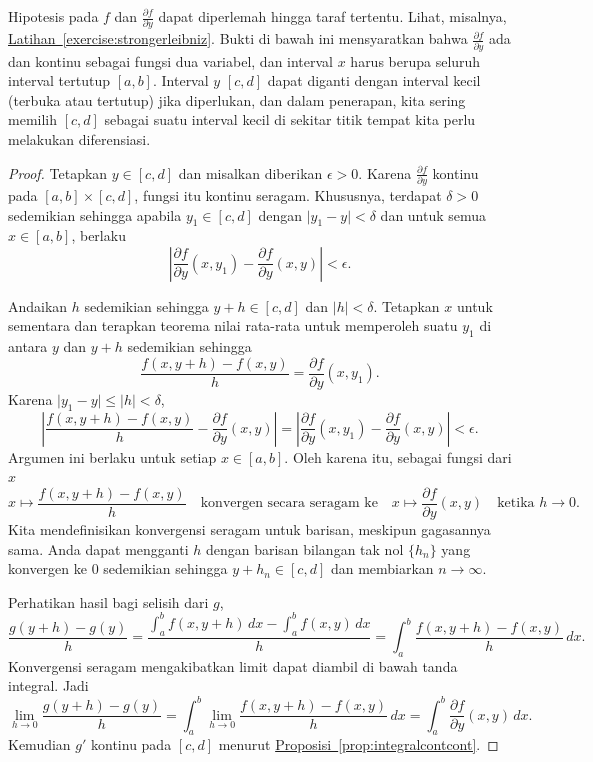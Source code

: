 \documentclass[12pt,openany]{book}
\newcommand{\sabs}[1]{\lvert {#1} \rvert}
\newcommand{\abs}[1]{\left\lvert {#1} \right\rvert}
\theoremstyle{plain}
\theoremstyle{remark}
\theoremstyle{definition}
\theoremstyle{exercise}
\theoremstyle{example}
\newcommand{\exerciseref}[1]{\hyperref[#1]{Latihan~\ref*{#1}}}
\newcommand{\propref}[1]{\hyperref[#1]{Proposisi~\ref*{#1}}}
\begin{document}
Hipotesis pada $f$ dan $\frac{\partial f}{\partial y}$ dapat
diperlemah hingga taraf tertentu. Lihat, misalnya, \exerciseref{exercise:strongerleibniz}.
Bukti di bawah ini mensyaratkan bahwa
$\frac{\partial f}{\partial y}$ ada dan kontinu
sebagai fungsi dua variabel, dan interval $x$ harus berupa seluruh
interval tertutup $[a,b]$.
Interval $y$
$[c,d]$ dapat diganti dengan interval kecil (terbuka atau tertutup) jika
diperlukan, dan dalam penerapan, kita sering memilih $[c,d]$ sebagai suatu
interval kecil di sekitar titik tempat kita perlu melakukan diferensiasi.

\begin{proof}
Tetapkan $y \in [c,d]$ dan misalkan diberikan $\epsilon > 0$.
Karena $\frac{\partial f}{\partial y}$ kontinu pada $[a,b] \times [c,d]$, fungsi itu
kontinu seragam.  Khususnya, terdapat $\delta > 0$ sedemikian sehingga
apabila $y_1 \in [c,d]$ dengan
$\sabs{y_1-y} < \delta$ dan untuk semua $x \in [a,b]$, berlaku
\begin{equation*}
\abs{\frac{\partial f}{\partial y}(x,y_1)-\frac{\partial f}{\partial y}(x,y)} < \epsilon .
\end{equation*}

Andaikan $h$ sedemikian sehingga $y+h \in [c,d]$ dan $\sabs{h} < \delta$.
Tetapkan $x$ untuk sementara
dan terapkan teorema nilai rata-rata untuk memperoleh suatu $y_1$ di antara $y$ dan $y+h$ sedemikian sehingga
\begin{equation*}
\frac{f(x,y+h)-f(x,y)}{h}
=
\frac{\partial f}{\partial y}(x,y_1) .
\end{equation*}
Karena $\sabs{y_1-y} \leq \sabs{h} < \delta$,
\begin{equation*}
\abs{
\frac{f(x,y+h)-f(x,y)}{h}
-
\frac{\partial f}{\partial y}(x,y) 
}
=
\abs{
\frac{\partial f}{\partial y}(x,y_1) 
-
\frac{\partial f}{\partial y}(x,y) 
}
< \epsilon .
\end{equation*}
Argumen ini berlaku untuk setiap $x \in [a,b]$.  Oleh karena itu, sebagai fungsi dari
$x$
\begin{equation*}
x \mapsto \frac{f(x,y+h)-f(x,y)}{h}
\quad
\text{konvergen secara seragam ke}
\quad
x \mapsto \frac{\partial f}{\partial y}(x,y)
\quad
\text{ketika } h \to 0 .
\end{equation*}
Kita mendefinisikan konvergensi seragam untuk barisan, meskipun gagasannya
sama.  Anda dapat mengganti $h$ dengan barisan bilangan tak nol
$\{ h_n \}$
yang konvergen ke $0$ sedemikian sehingga $y+h_n \in [c,d]$ dan membiarkan $n \to \infty$.

Perhatikan hasil bagi selisih dari $g$,
\begin{equation*}
\frac{g(y+h)-g(y)}{h}
=
\frac{\int_a^b f(x,y+h) \,dx -
\int_a^b f(x,y) \,dx }{h}
=
\int_a^b \frac{f(x,y+h)-f(x,y)}{h} \,dx .
\end{equation*}
Konvergensi seragam mengakibatkan limit dapat diambil di bawah tanda integral.
Jadi
\begin{equation*}
\lim_{h\to 0}
\frac{g(y+h)-g(y)}{h}
= 
\int_a^b 
\lim_{h\to 0}
\frac{f(x,y+h)-f(x,y)}{h} \,dx 
=
\int_a^b 
\frac{\partial f}{\partial y}(x,y) \,dx .
\end{equation*}
Kemudian $g'$ kontinu pada $[c,d]$ menurut
\propref{prop:integralcontcont}.
\end{proof}
\end{document}
